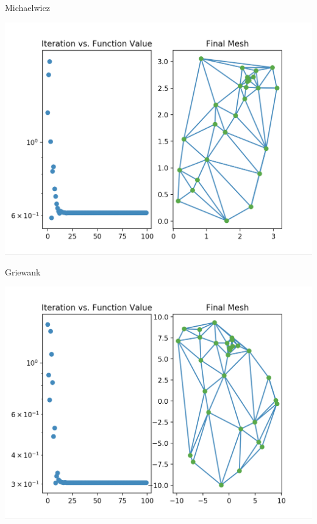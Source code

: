 \documentclass[xcolor=dvipsnames]{beamer}
\begin{document}
\begin{frame}{Michaelwicz}
\begin{center}
\includegraphics[width=0.8\columnwidth]{MichaelwiczError.png}
\end{center}
\end{frame}
\begin{frame}{Griewank}
\begin{center}
\includegraphics[width=0.8\columnwidth]{GriewankError.png}
\end{center}
\end{frame}
\end{document}
